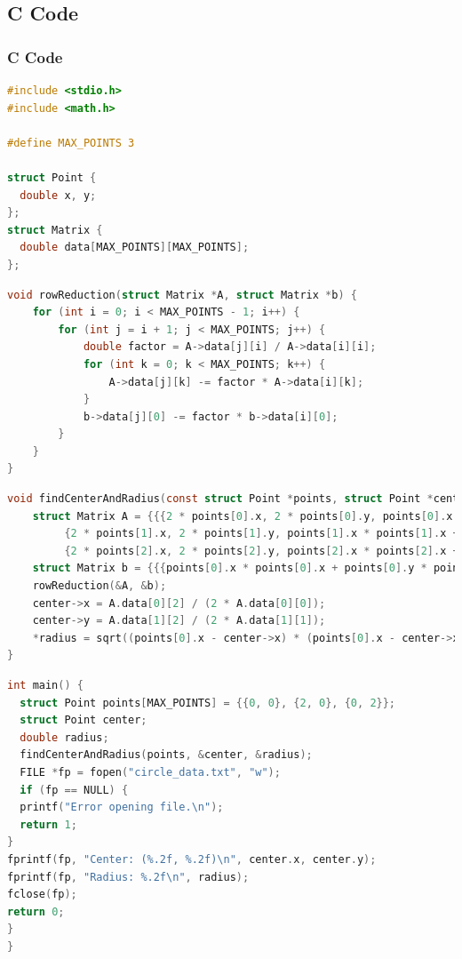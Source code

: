 \documentclass{beamer}
\theoremstyle{remark}
\numberwithin{equation}{section}
\begin{document}
\subsection{C Code}
\begin{frame}[fragile]
\frametitle{C Code}
\begin{lstlisting}[language=C]
#include <stdio.h>
#include <math.h>

#define MAX_POINTS 3

struct Point {
  double x, y;
};
struct Matrix {
  double data[MAX_POINTS][MAX_POINTS];
};
\end{lstlisting}
\end{frame}
\begin{frame}[fragile]
\begin{lstlisting}[language=C]
void rowReduction(struct Matrix *A, struct Matrix *b) {
    for (int i = 0; i < MAX_POINTS - 1; i++) {
        for (int j = i + 1; j < MAX_POINTS; j++) {
            double factor = A->data[j][i] / A->data[i][i];
            for (int k = 0; k < MAX_POINTS; k++) {
                A->data[j][k] -= factor * A->data[i][k];
            }
            b->data[j][0] -= factor * b->data[i][0];
        }
    }
}
\end{lstlisting}
\end{frame}
\begin{frame}[fragile]
\begin{lstlisting}[language=C]
void findCenterAndRadius(const struct Point *points, struct Point *center, double *radius) {
    struct Matrix A = {{{2 * points[0].x, 2 * points[0].y, points[0].x * points[0].x + points[0].y * points[0].y},
         {2 * points[1].x, 2 * points[1].y, points[1].x * points[1].x + points[1].y * points[1].y},
         {2 * points[2].x, 2 * points[2].y, points[2].x * points[2].x + points[2].y * points[2].y}}};
    struct Matrix b = {{{points[0].x * points[0].x + points[0].y * points[0].y},{points[1].x * points[1].x + points[1].y * points[1].y},{points[2].x * points[2].x + points[2].y * points[2].y}}};
    rowReduction(&A, &b); 
    center->x = A.data[0][2] / (2 * A.data[0][0]);
    center->y = A.data[1][2] / (2 * A.data[1][1]);
    *radius = sqrt((points[0].x - center->x) * (points[0].x - center->x) + (points[0].y - center->y) * (points[0].y - center->y));
}
\end{lstlisting}
\end{frame}
\begin{frame}[fragile]
\begin{lstlisting}[language=C]
int main() {
  struct Point points[MAX_POINTS] = {{0, 0}, {2, 0}, {0, 2}};
  struct Point center;
  double radius;
  findCenterAndRadius(points, &center, &radius);
  FILE *fp = fopen("circle_data.txt", "w");
  if (fp == NULL) {
  printf("Error opening file.\n");
  return 1;
}
fprintf(fp, "Center: (%.2f, %.2f)\n", center.x, center.y);
fprintf(fp, "Radius: %.2f\n", radius);
fclose(fp);
return 0;
}
}
\end{lstlisting}
\end{frame}
\end{document}
